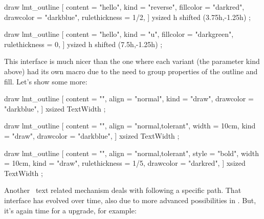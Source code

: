     draw lmt_outline [
        content       = "hello",
        kind          = "reverse",
        fillcolor     = "darkred",
        drawcolor     = "darkblue",
        rulethickness = 1/2,
    ] ysized h shifted (3.75h,-1.25h) ;

    draw lmt_outline [
        content       = "hello",
        kind          = "u",
        fillcolor     = "darkgreen",
        rulethickness = 0,
    ] ysized h shifted (7.5h,-1.25h) ;
\stopMPcode
\stopbuffer

\typebuffer[option=TEX]

\startlinecorrection
\getbuffer
\stoplinecorrection

This interface is much nicer than the one where each variant (the parameter \type
{kind} above) had its own macro due to the need to group properties of the
outline and fill. Let's show some more:

\startbuffer
{}
    draw lmt_outline [
        content   = "\obeydiscretionaries{}",
        align     = "normal",
        kind      = "draw",
        drawcolor = "darkblue",
    ] xsized TextWidth ;
\stopMPcode
\stopbuffer

\typebuffer[option=TEX]

\startlinecorrection
\getbuffer
\stoplinecorrection

\startbuffer
{}
    draw lmt_outline [
        content   = "\obeydiscretionaries{}",
        align     = "normal,tolerant",
        width     = 10cm,
        kind      = "draw",
        drawcolor = "darkblue",
    ] xsized TextWidth ;
\stopMPcode
\stopbuffer

\typebuffer[option=TEX]

\startlinecorrection
\getbuffer
\stoplinecorrection

\startbuffer
{}
    draw lmt_outline [
        content       = "\obeydiscretionaries{}",
        align         = "normal,tolerant",
        style         = "bold",
        width         = 10cm,
        kind          = "draw",
        rulethickness = 1/5,
        drawcolor     = "darkred",
    ] xsized TextWidth ;
\stopMPcode
\stopbuffer

\typebuffer[option=TEX]

\startlinecorrection
\getbuffer
\stoplinecorrection

Another \METAFUN\ text related mechanism deals with following a specific path.
That interface has evolved over time, also due to more advanced possibilities in
\MKIV. But, it's again time for a upgrade, for example:

